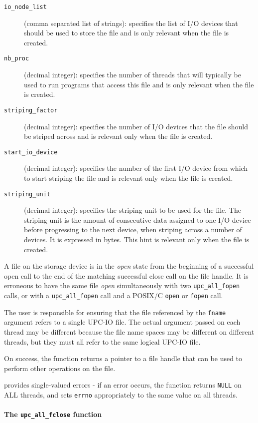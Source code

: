 \documentclass[12pt,titlepage]{article}
\newcounter{parnum}
\newcommand\np{\addtocounter{parnum}{1}\hspace{-2em}\makebox[2em][l]{\arabic{parnum}}}
\begin{document}
\begin{description}
\item [{\tt io\_node\_list}] (comma separated list of strings): specifies the list of I/O
devices that should be used to store the file and is only relevant when the
file is created. 
\item [{\tt nb\_proc}] (decimal integer): specifies the number of threads that will typically be
used to run programs that access this file and is only relevant when the
file is created.
\item[{\tt striping\_factor}] (decimal integer): specifies the number of I/O devices that the
file should be striped across and is relevant only when the file is created.
\item[{\tt start\_io\_device}] (decimal integer): specifies the number of the first I/O device
from which to start striping the file and is relevant only when the file is
created.
\item[{\tt striping\_unit}] (decimal integer): specifies the striping unit to be used for the
file. The striping unit is the amount of consecutive data assigned to one
I/O device before progressing to the next device, when striping across a
number of devices. It is expressed in bytes. This hint is relevant only when
the file is created.
\end{description}

\np A file on the storage device is in the \textit{open} state from the
beginning of a successful open call to the end of the matching successful close call
on the file handle. It is
erroneous to have the same file \textit{open} simultaneously with two
{\tt upc\_all\_fopen} calls, or with a {\tt upc\_all\_fopen} call and a POSIX/C {\tt open} or
{\tt fopen} call.

\np The user is responsible for ensuring that the file referenced by the {\tt fname}
argument refers to a single UPC-IO file. The actual argument passed on each thread
may be different because the file name spaces may be different on different
threads, but they must all refer to the same logical UPC-IO file.

\np On success, the function returns a pointer to a file handle that can be
used to perform other operations on the file. 

\np {\tt upc\_all\_fopen} provides single-valued errors - if an error occurs, the
function returns {\tt NULL} on ALL threads, and sets {\tt errno} appropriately
to the same value on all threads.

\paragraph{The {\tt upc\_all\_fclose} function}\ \\
\end{document}
